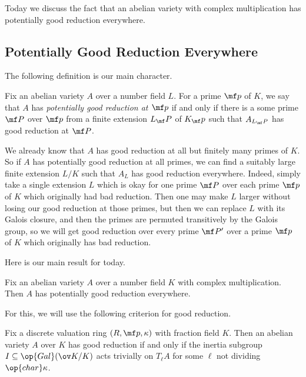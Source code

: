 \documentclass[../notes.tex]{subfiles}
\begin{document}
Today we discuss the fact that an abelian variety with complex multiplication has potentially good reduction everywhere.

\subsection{Potentially Good Reduction Everywhere}
The following definition is our main character.
\begin{definition}
	Fix an abelian variety $A$ over a number field $L$. For a prime $\mf p$ of $K$, we say that $A$ has \textit{potentially good reduction at $\mf p$} if and only if there is a some prime $\mf P$ over $\mf p$ from a finite extension $L_\mf P$ of $K_\mf p$ such that $A_{L_\mf P}$ has good reduction at $\mf P$.
\end{definition}
\begin{remark}
	We already know that $A$ has good reduction at all but finitely many primes of $K$. So if $A$ has potentially good reduction at all primes, we can find a suitably large finite extension $L/K$ such that $A_L$ has good reduction everywhere. Indeed, simply take a single extension $L$ which is okay for one prime $\mf P$ over each prime $\mf p$ of $K$ which originally had bad reduction. Then one may make $L$ larger without losing our good reduction at those primes, but then we can replace $L$ with its Galois closure, and then the primes are permuted transitively by the Galois group, so we will get good reduction over every prime $\mf P'$ over a prime $\mf p$ of $K$ which originally has bad reduction.
\end{remark}
Here is our main result for today.
\begin{proposition} \label{prop:cm-av-good-reduction}
	Fix an abelian variety $A$ over a number field $K$ with complex multiplication. Then $A$ has potentially good reduction everywhere.
\end{proposition}
For this, we will use the following criterion for good reduction.
\begin{theorem}
	Fix a discrete valuation ring $(R,\mf p,\kappa)$ with fraction field $K$. Then an abelian variety $A$ over $K$ has good reduction if and only if the inertia subgroup $I\subseteq\op{Gal}(\ov K/K)$ acts trivially on $T_\ell A$ for some $\ell$ not dividing $\op{char}\kappa$.
\end{theorem}
\end{document}
